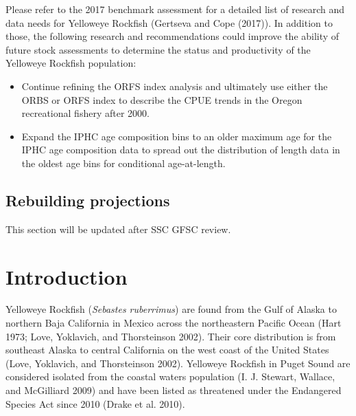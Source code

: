 \documentclass[
]{scrartcl}
\providecommand{\tightlist}{%
  \setlength{\itemsep}{0pt}\setlength{\parskip}{0pt}}\usepackage{longtable,booktabs,array}
\begin{document}
Please refer to the 2017 benchmark assessment for a detailed list of
research and data needs for Yelloweye Rockfish (Gertseva and Cope
(2017)). In addition to those, the following research and
recommendations could improve the ability of future stock assessments to
determine the status and productivity of the Yelloweye Rockfish
population:

\begin{itemize}
\tightlist
\item
  Continue refining the ORFS index analysis and ultimately use either
  the ORBS or ORFS index to describe the CPUE trends in the Oregon
  recreational fishery after 2000.
\item
  Expand the IPHC age composition bins to an older maximum age for the
  IPHC age composition data to spread out the distribution of length
  data in the oldest age bins for conditional age-at-length.
\end{itemize}

\subsection*{Rebuilding projections}\label{rebuilding-projections}

This section will be updated after SSC GFSC review.

\pagebreak

\newpage{}

\setlength{\parskip}{5mm plus1mm minus1mm}
\setcounter{page}{1}
\setcounter{section}{0}
\renewcommand{\thefigure}{\arabic{figure}}
\renewcommand{\thetable}{\arabic{table}}
\setcounter{table}{0}
\setcounter{figure}{0}

\section{Introduction}\label{introduction}

Yelloweye Rockfish (\emph{Sebastes ruberrimus}) are found from the Gulf
of Alaska to northern Baja California in Mexico across the northeastern
Pacific Ocean (Hart 1973; Love, Yoklavich, and Thorsteinson 2002). Their
core distribution is from southeast Alaska to central California on the
west coast of the United States (Love, Yoklavich, and Thorsteinson
2002). Yelloweye Rockfish in Puget Sound are considered isolated from
the coastal waters population (I. J. Stewart, Wallace, and McGilliard
2009) and have been listed as threatened under the Endangered Species
Act since 2010 (Drake et al. 2010).
\end{document}
